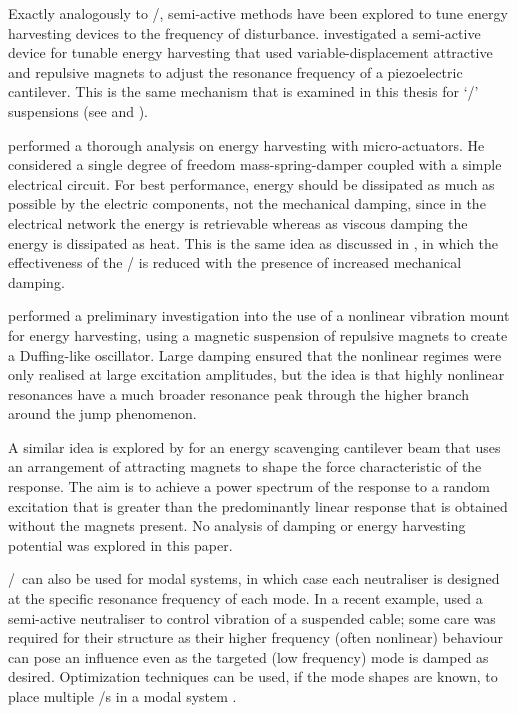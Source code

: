 Exactly analogously to \vibneut/, semi-active methods have been explored to tune energy harvesting devices to the frequency of disturbance.
\textcite{challa2008} investigated a semi-active device for tunable energy harvesting that used variable-displacement attractive and repulsive magnets to adjust the resonance frequency of a piezoelectric cantilever.
This is the same mechanism that is examined in this thesis for `\qzs/' suspensions (see  and ).

\textcite{stephen2006} performed a thorough analysis on energy harvesting with micro-actuators.
He considered a single degree of freedom mass-spring-damper coupled with a simple electrical circuit.
For best performance, energy should be dissipated as much as possible by the electric components, not the mechanical damping, since in the electrical network the energy is retrievable whereas as viscous damping the energy is dissipated as heat.
This is the same idea as discussed in , in which the effectiveness of the \vibneut/ is reduced with the presence of increased mechanical damping.

\textcite{mann2008} performed a preliminary investigation into the use of a nonlinear vibration mount for energy harvesting, using a magnetic suspension of repulsive magnets to create a Duffing-like oscillator.
Large damping ensured that the nonlinear regimes were only realised at large excitation amplitudes, but the idea is that highly nonlinear resonances have a much broader resonance peak through the higher branch around the jump phenomenon. 

A similar idea is explored by \textcite{shahruz2008} for an energy scavenging cantilever beam that uses an arrangement of attracting magnets to shape the force characteristic of the response.
The aim is to achieve a power spectrum of the response to a random excitation that is greater than the predominantly linear response that is obtained without the magnets present.
No analysis of damping or energy harvesting potential was explored in this paper.

\Vibneut/\ can also be used for modal systems, in which case each neutraliser is designed at the specific resonance frequency of each mode.
In a recent example, \textcite{casciati2007} used a semi-active neutraliser to control vibration of a suspended cable; some care was required for their structure as their higher frequency (often nonlinear) behaviour can pose an influence even as the targeted (low frequency) mode is damped as desired.
Optimization techniques can be used, if the mode shapes are known, to place multiple \vibneut/s in a modal system \cite{petit2009}.

